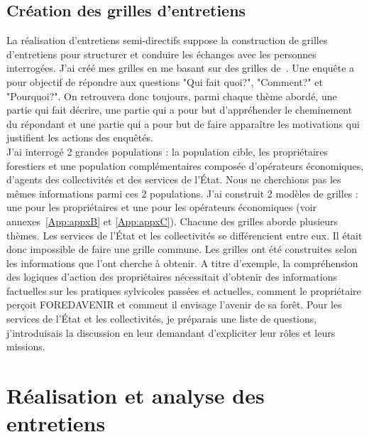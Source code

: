 \documentclass[12pt]{report}
\begin{document}
\subsection{Création des grilles d'entretiens}

La réalisation d'entretiens semi-directifs
suppose la construction de grilles
d'entretiens pour structurer et conduire les échanges
avec les personnes interrogées. J'ai créé mes grilles en me basant sur des
grilles de~\citet{consoreDeufficDehez_ref79,deuffic2012_ref91}. Une enquête a
pour objectif de répondre aux questions "Qui fait quoi?", "Comment?" et "Pourquoi?". On
retrouvera donc toujours, parmi chaque thème abordé, une partie qui fait décrire,
une partie qui a pour but d'appréhender le cheminement du répondant et une
partie qui a pour but de faire apparaître les motivations qui justifient les
actions des enquêtés.\\

J'ai interrogé 2 grandes populations : la population cible, les propriétaires
forestiers et une population complémentaires composée d'opérateurs économiques,
d'agents des collectivités et des services de l’État. Nous ne cherchions
pas les mêmes informations parmi ces 2 populations. J'ai construit 2 modèles de
grilles : une pour les propriétaires et une pour les opérateurs économiques (voir
annexes~\ref{App:appxB} et \ref{App:appxC}). Chacune des grilles aborde plusieurs thèmes. Les services
de l’État et les collectivités se différencient entre eux. Il était donc impossible de faire une
grille commune. Les grilles ont
été construites selon les informations que l'ont cherche à obtenir. A titre
d’exemple, la compréhension des logiques d'action des propriétaires nécessitait
d'obtenir des informations factuelles sur les pratiques sylvicoles passées et
actuelles, comment le propriétaire perçoit FOREDAVENIR et comment il envisage
l'avenir de sa forêt. Pour les services de l’État et les collectivités, je
préparais une liste de questions, j'introduisais la discussion en leur demandant
d'expliciter leur rôles et leurs missions.

\section{Réalisation et analyse des entretiens}
\end{document}
